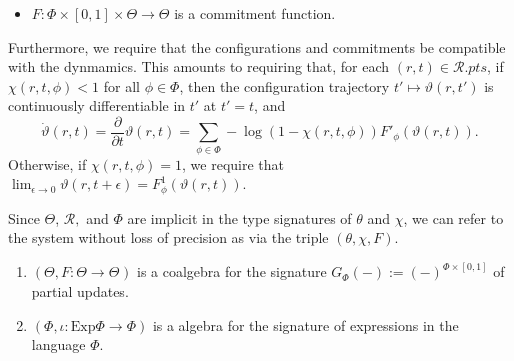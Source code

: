 \documentclass{article}
\newcommand\pts[1]{#1.\mathit{pts}}
\newcommand\R{\mathcal R}
\begin{document}
\begin{defn}
\begin{itemize}[]
        \item $F : \Phi \times [0,1] \times \Theta \to \Theta$ is a commitment function.
    \end{itemize}
    Furthermore, we require that the configurations and commitments be compatible with the dynmamics.
    This amounts to requiring that,
    for each $(r,t) \in \pts \R$,
        if $\chi(r,t,\phi) < 1$ for all $\phi \in \Phi$, then
    the configuration trajectory $t' \mapsto \vartheta(r,t')$ is continuously differentiable in $t'$ at $t'=t$, and
    \[
        \dot\vartheta(r,t) = \frac{\partial}{\partial t} \vartheta(r, t) =
            \sum_{\phi \in \Phi} -\log (1 - \chi(r,t,\phi)) F'_\phi(\vartheta(r,t)).
    \]
    Otherwise, if $\chi(r,t,\phi) = 1$, we require that
    $\displaystyle
        \lim_{\epsilon \to 0} \vartheta(r,t+\epsilon) =
            F^1_\phi(\vartheta(r,t))
    $.

    Since $\Theta$, $\R,$ and $\Phi$ are implicit in the type signatures of $\theta$ and $\chi$, we can refer to the system without loss of precision as via the triple $(\theta, \chi, F)$.
\end{defn}

\begin{remark}
    \begin{enumerate}
        \item
        $(\Theta, F: \Theta \to \Theta^{})$ is a coalgebra for the signature $G_\Phi(-) := (-)^{\Phi \times [0,1]}$ of partial updates.
        \item $(\Phi, \iota : \mathrm{Exp} \Phi \to \Phi)$ is a algebra for the signature of expressions in the language $\Phi$.
    \end{enumerate}
\end{remark}
\end{document}
